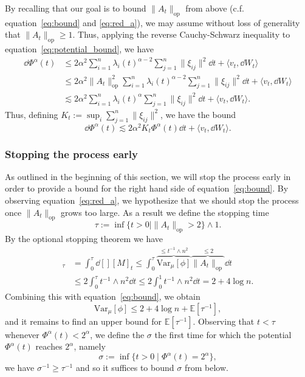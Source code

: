 By recalling that our goal is to bound \(\|A_t\|_{\text{op}}\) from above (c.f. equation~\eqref{eq:bound} and \eqref{eq:red_a}), 
we may assume without loss of generality that \(\|A_t\|_{\text{op}} \ge 1\). Thus, applying the reverse Cauchy-Schwarz inequality to 
equation~\eqref{eq:potential_bound}, we have
\begin{align*}
  \dd \Phi^\alpha(t) & \le 2\alpha^2 \sum_{i = 1}^n \lambda_i(t)^{\alpha - 2} \sum_{j = 1}^n \|\xi_{ij}\|^2 \dd t + \langle v_t, \dd W_t\rangle\\
    & \le 2\alpha^2 \|A_t\|_{\text{op}}^2 \sum_{i = 1}^n \lambda_i(t)^{\alpha - 2} \sum_{j = 1}^n \|\xi_{ij}\|^2 \dd t + \langle v_t, \dd W_t\rangle\\
    & \lesssim 2\alpha^2\sum_{i = 1}^n \lambda_i(t)^\alpha \sum_{j = 1}^n \|\xi_{ij}\|^2 \dd t + \langle v_t, \dd W_t\rangle.
\end{align*} 
Thus, defining \(K_t := \sup_i \sum_{j = 1}^n \|\xi_{ij}\|^2\), we have the bound 
\begin{equation}\label{eq:potential_bound_2}
  \dd \Phi^\alpha(t) \lesssim 2\alpha^2 K_t \Phi^\alpha(t) \dd t + \langle v_t, \dd W_t\rangle.
\end{equation}

\subsubsection{Stopping the process early}

As outlined in the beginning of this section, we will stop the process early in order to provide a 
bound for the right hand side of equation~\eqref{eq:bound}. By observing equation~\eqref{eq:red_a}, we hypothesize that
we should stop the process once \(\|A_t\|_{\text{op}}\) grows too large. As a result we define the stopping time 
\[\tau := \inf\{t > 0 \mid \|A_t\|_{\text{op}} > 2\} \wedge 1.\]
By the optional stopping theorem we have
\begin{align*}
  [M]_\tau & = \int_0^\tau \dd[] [M]_t 
      \le \int_0^\tau \overbrace{\text{Var}_\mu[\phi]}^{\le t^{-1} \wedge n^2} \overbrace{\|A_t\|_{\text{op}}}^{\le 2} \dd t\\
    & \le 2 \int_0^\tau t^{-1} \wedge n^2 \dd t \le 2 \int_0^1 t^{-1} \wedge n^2 \dd t = 2 + 4 \log n.
\end{align*}
Combining this with equation~\eqref{eq:bound}, we obtain
\begin{equation}\label{eq:tau_bd}
  \text{Var}_\mu[\phi] \le 2 + 4 \log n + \mathbb{E}[\tau^{-1}],
\end{equation}
and it remains to find an upper bound for \(\mathbb{E}[\tau^{-1}]\). Observing that \(t < \tau\) whenever 
\(\Phi^\alpha(t) < 2^\alpha\), we define the \(\sigma\) the first time for which the potential \(\Phi^\alpha(t)\) reaches \(2^\alpha\),
namely
\[\sigma := \inf \{t > 0 \mid \Phi^\alpha(t) = 2^\alpha\},\] 
we have \(\sigma^{-1} \ge \tau^{-1}\) and so it suffices to bound \(\sigma\) from below. 

